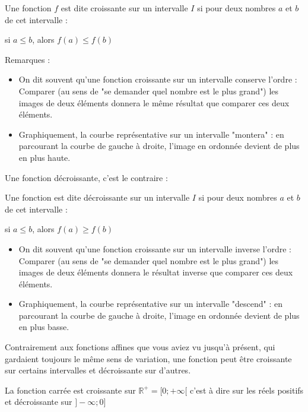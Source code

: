 \documentclass[10pt,a4paper]{book}
\newcommand{\R}{\mathbb{R}}
\begin{document}
\begin{de}
    Une fonction $f$ est dite croissante sur un intervalle $I$ si pour deux nombres $a$ et $b$ de cet intervalle :
    \vspace{0.3cm}
    \begin{center}
    si $a \leq b$,  alors $f(a) \leq f(b)$
    \end{center}
\end{de}

Remarques :
\begin{itemize}
    \item On dit souvent qu'une fonction croissante sur un intervalle conserve l'ordre : Comparer (au sens de "se demander quel nombre est le plus grand") les images de deux éléments donnera le même résultat que comparer ces deux éléments.
    \item Graphiquement, la courbe représentative sur un intervalle "montera" : en parcourant la courbe de gauche à droite, l'image en ordonnée devient de plus en plus haute.
\end{itemize}

Une fonction décroissante, c'est le contraire :

\begin{de}
    Une fonction est dite décroissante sur un intervalle $I$ si pour deux nombres $a$ et $b$ de cet intervalle :
    \vspace{0.3cm}
    \begin{center}
    si $a \leq b$,  alors $f(a) \geq f(b)$
    \end{center}
\end{de}

\begin{itemize}
    \item On dit souvent qu'une fonction croissante sur un intervalle inverse l'ordre : Comparer (au sens de "se demander quel nombre est le plus grand") les images de deux éléments donnera le résultat inverse que comparer ces deux éléments.
    \item Graphiquement, la courbe représentative sur un intervalle "descend" : en parcourant la courbe de gauche à droite, l'image en ordonnée devient de plus en plus basse.
\end{itemize}

Contrairement aux fonctions affines que vous aviez vu jusqu'à présent, qui gardaient toujours le même sens de variation, une fonction peut être croissante sur certains intervalles et décroissante sur d'autres. 

La fonction carrée est croissante sur $\R^+=[0;+\infty[$ c'est à dire sur les réels positifs et décroissante sur $]-\infty;0]$
\end{document}

